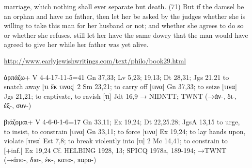 \documentclass[11pt]{article}
\begin{document}
\begin{quoe}
marriage, which nothing shall ever separate but death. (71) But if the damsel be an orphan and have no father, then let her be asked by the judges whether she is willing to take this man for her husband or not; and whether she agrees to do so or whether she refuses, still let her have the same dowry that the man would have agreed to give her while her father was yet alive.

\url{http://www.earlyjewishwritings.com/text/philo/book29.html}


\begin{greek} ἁρπάζω+ V 4-4-17-11-5=41
Gn 37,33; Lv 5,23; 19,13; Dt 28,31; Jgs 21,21
to snatch away [τι ἔκ τινος] 2 Sm 23,21; to carry off [τινα] Gn 37,33; to seize [τινα] Jgs 21,21; to
captivate, to ravish [τι] Jdt 16,9
→ NIDNTT; TWNT
(→ἀν-, δι-, ἐξ-, συν-) 
\end{greek}

\begin{greek}
βιάζομαι+ V 4-6-0-1-6=17
Gn 33,11; Ex 19,24; Dt 22,25.28; JgsA 13,15
to urge, to insist, to constrain [τινα] Gn 33,11; to force [τινα] Ex 19,24; to lay hands upon, violate [τινα]
Est 7,8; to break violently into [τι] 2 Mc 14,41; to constrain to [+inf.] Ex 19,24
Cf. HELBING 1928, 13; SPICQ 1978a, 189-194; →TWNT
(→ἀπο-, δια-, ἐκ-, κατα-, παρα-) 
\end{greek}



\end{quoe}
\end{document}
